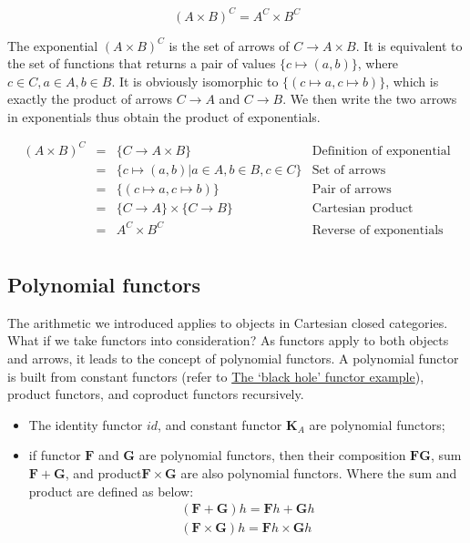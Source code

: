 \documentclass[b5paper]{article}
\begin{document}
\[
  (A \times B)^C = A^C \times B^C
\]

The exponential $(A \times B)^C$ is the set of arrows of $C \to A \times B$. It is equivalent to the set of functions that returns a pair of values $\{ c \mapsto (a, b)\}$, where $c \in C, a \in A, b \in B$. It is obviously isomorphic to $\{(c \mapsto a, c \mapsto b)\}$, which is exactly the product of arrows $C \to A$ and $C \to B$. We then write the two arrows in exponentials thus obtain the product of exponentials.

\[
\begin{array}{rcll}
(A \times B)^C & = & \{C \to A \times B \}  & \text{Definition of exponential} \\
    & = & \{ c \mapsto (a, b) | a \in A, b \in B, c \in C\} & \text{Set of arrows} \\
    & = & \{ (c \mapsto a, c \mapsto b) \} & \text{Pair of arrows} \\
    & = & \{C \to A\} \times \{C \to B\} & \text{Cartesian product} \\
    & = & A^C \times B^C & \text{Reverse of exponentials} \\
\end{array}
\]

\subsection{Polynomial functors}
\label{sec:polynomial-functors}

The arithmetic we introduced applies to objects in Cartesian closed categories. What if we take functors into consideration? As functors apply to both objects and arrows, it leads to the concept of polynomial functors. A polynomial functor is built from constant functors (refer to \hyperref[sec:functor:examples]{The `black hole' functor example}), product functors, and coproduct functors recursively.

\begin{itemize}
  \item The identity functor $id$, and constant functor $\mathbf{K}_A$ are polynomial functors;
  \item if functor $\mathbf{F}$ and $\mathbf{G}$ are polynomial functors, then their composition $\mathbf{FG}$, sum $\mathbf{F} + \mathbf{G}$, and product$\mathbf{F} \times \mathbf{G}$ are also polynomial functors. Where the sum and product are defined as below:
  \[
    \begin{array}{l}
    (\mathbf{F} + \mathbf{G}) h = \mathbf{F} h + \mathbf{G} h \\
    (\mathbf{F} \times \mathbf{G}) h = \mathbf{F} h \times \mathbf{G} h \\
    \end{array}
  \]
\end{itemize}
\end{document}
